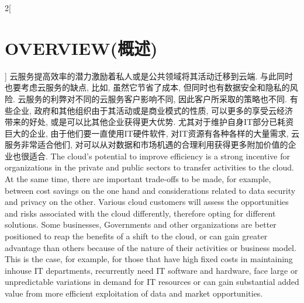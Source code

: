 \documentclass[a4paper, UTF8, 12pt]{article}
\begin{document}
\begin{paracol}{2}[\section{OVERVIEW(概述)}]
    \switchcolumn*
    云服务提高效率的潜力激励着私人或是公共领域将其活动迁移到云端. 与此同时也要考虑云服务的缺点, 比如, 虽然它节省了成本, 但同时也有数据安全和隐私的风险. 云服务的利弊对不同的云服务客户影响不同, 因此客户所采取的策略也不同. 有些企业, 政府和其他组织由于其活动或是商业模式的性质, 可以更多的享受云经济带来的好处, 或是可以比其他企业获得更大优势. 尤其对于维护自身IT部分已耗资巨大的企业, 由于他们要一直使用IT硬件软件, 对IT资源有各种各样的大量需求, 云服务非常适合他们, 对可以从对数据和市场机遇的合理利用获得更多附加价值的企业也很适合.
    \switchcolumn
    The cloud’s potential to improve efficiency is a strong incentive for organizations in the private and public sectors to transfer activities to the cloud. At the same time, there are important trade-offs to be made, for example, between cost savings on the one hand and considerations related to data security and privacy on the other. Various cloud customers will assess the opportunities and risks associated with the cloud differently, therefore opting for different solutions. Some businesses, Governments and other organizations are better positioned to reap the benefits of a shift to the cloud, or can gain greater advantage than others because of the nature of their activities or business model. This is the case, for example, for those that have high fixed costs in maintaining inhouse IT departments, recurrently need IT software and hardware, face large or unpredictable variations in demand for IT resources or can gain substantial added value from more efficient exploitation of data and market opportunities. 

\end{paracol}
\end{document}
